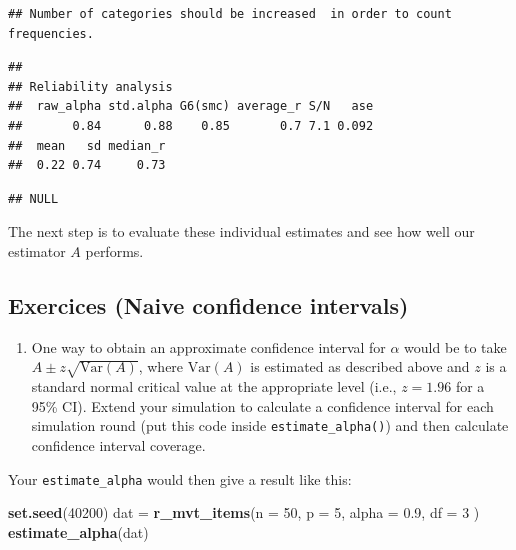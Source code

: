 \documentclass[
]{book}
\newenvironment{Shaded}{\begin{snugshade}}{\end{snugshade}}
\newcommand{\AttributeTok}[1]{\textcolor[rgb]{0.13,0.29,0.53}{#1}}
\newcommand{\DecValTok}[1]{\textcolor[rgb]{0.00,0.00,0.81}{#1}}
\newcommand{\FloatTok}[1]{\textcolor[rgb]{0.00,0.00,0.81}{#1}}
\newcommand{\FunctionTok}[1]{\textcolor[rgb]{0.13,0.29,0.53}{\textbf{#1}}}
\newcommand{\NormalTok}[1]{#1}
\newcommand{\OtherTok}[1]{\textcolor[rgb]{0.56,0.35,0.01}{#1}}
\providecommand{\tightlist}{%
  \setlength{\itemsep}{0pt}\setlength{\parskip}{0pt}}
\begin{document}
\begin{verbatim}
## Number of categories should be increased  in order to count frequencies.
\end{verbatim}

\begin{verbatim}
## 
## Reliability analysis   
##  raw_alpha std.alpha G6(smc) average_r S/N   ase
##       0.84      0.88    0.85       0.7 7.1 0.092
##  mean   sd median_r
##  0.22 0.74     0.73
\end{verbatim}

\begin{verbatim}
## NULL
\end{verbatim}

The next step is to evaluate these individual estimates and see how well our estimator \(A\) performs.

\subsection{Exercices (Naive confidence intervals)}\label{exercices-naive-confidence-intervals}

\begin{enumerate}
\def\labelenumi{\arabic{enumi}.}
\tightlist
\item
  One way to obtain an approximate confidence interval for \(\alpha\) would be to take \(A \pm z \sqrt{\text{Var}(A)}\), where \(\text{Var}(A)\) is estimated as described above and \(z\) is a standard normal critical value at the appropriate level (i.e., \(z = 1.96\) for a 95\% CI).
  Extend your simulation to calculate a confidence interval for each simulation round (put this code inside \texttt{estimate\_alpha()}) and then calculate confidence interval coverage.
\end{enumerate}

Your \texttt{estimate\_alpha} would then give a result like this:

\begin{Shaded}
\begin{Highlighting}[]
\FunctionTok{set.seed}\NormalTok{(}\DecValTok{40200}\NormalTok{)}
\NormalTok{dat }\OtherTok{=} \FunctionTok{r\_mvt\_items}\NormalTok{(}\AttributeTok{n =} \DecValTok{50}\NormalTok{, }\AttributeTok{p =} \DecValTok{5}\NormalTok{, }\AttributeTok{alpha =} \FloatTok{0.9}\NormalTok{, }\AttributeTok{df =} \DecValTok{3}\NormalTok{ )}
\FunctionTok{estimate\_alpha}\NormalTok{(dat)}
\end{Highlighting}
\end{Shaded}
\end{document}
